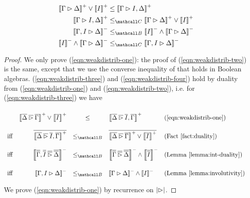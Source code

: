 \begin{lemma}
  \begin{align}
    \psint{\Gamma \J \Delta} \lor \psint{I} &\sement \psint{\Gamma \J I, \Delta} \label{eqn:weakdistrib-one} \\
    \psint{\Gamma \J I, \Delta} &\sementC \psint{\Gamma \J \Delta} \lor \psint{I} \label{eqn:weakdistrib-two} \\
    \nsint{\Gamma, I \J \Delta} &\sementB \nsint{I} \land \nsint{\Gamma \J \Delta} \label{eqn:weakdistrib-three} \\
    \nsint{I} \land \nsint{\Gamma \J \Delta} &\sementC \nsint{\Gamma, I \J \Delta} \label{eqn:weakdistrib-four}
  \end{align}
\end{lemma}
\begin{proof}
  We only prove (\ref{eqn:weakdistrib-one}): the proof of
  (\ref{eqn:weakdistrib-two}) is the same, except that we use the converse
  inequality of  that holds in Boolean algebras.
  (\ref{eqn:weakdistrib-three}) and (\ref{eqn:weakdistrib-four}) hold by duality
  from (\ref{eqn:weakdistrib-one}) and (\ref{eqn:weakdistrib-two}), i.e. for
  (\ref{eqn:weakdistrib-three}) we have
  $$
  \def\arraystretch{2.5}
  \begin{array}{rrcll}
               & \psint{\soldual{\Delta} \mathbin{\soldual{\J}} \soldual{\Gamma}} \lor \psint{\soldual{I}} &\sement& \psint{\soldual{\Delta} \mathbin{\soldual{\J}} \soldual{I}, \soldual{\Gamma}} &\text{(\ref{eqn:weakdistrib-one})} \\
    \text{iff} & \soldual{\psint{\soldual{\Delta} \mathbin{\soldual{\J}} \soldual{I}, \soldual{\Gamma}}} &\sementB& \soldual{\psint{\soldual{\Delta} \mathbin{\soldual{\J}} \soldual{\Gamma}} \lor \psint{\soldual{I}}} &\text{(\reffact{duality})} \\
    \text{iff} & \nsint{\soldual{\soldual{\Gamma}}, \soldual{\soldual{I}} \mathbin{\soldual{\mathbin{\soldual{\J}}}} \soldual{\soldual{\Delta}}} &\sementB& \nsint{\soldual{\soldual{\Gamma}} \mathbin{\soldual{\mathbin{\soldual{\J}}}} \soldual{\soldual{\Delta}}} \land \nsint{\soldual{\soldual{I}}} &\text{(\reflemma{int-duality})} \\
    \text{iff} & \nsint{\Gamma, I \mathbin{\J} \Delta} &\sementB& \nsint{\Gamma \mathbin{\J} \Delta} \land \nsint{I} &\text{(\reflemma{involutivity})} \\
  \end{array}
  $$
  We prove (\ref{eqn:weakdistrib-one}) by recurrence on $\left|\mathbin{\rhd}\right|$.

\end{proof}
